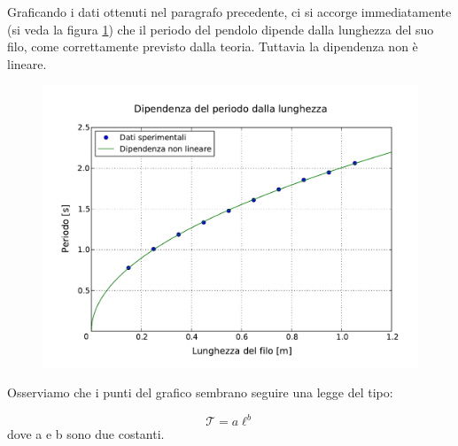 Graficando i dati ottenuti nel paragrafo precedente, ci si accorge immediatamente (si veda
la figura \ref{fig:lunghezza_periodo}) che il periodo del pendolo dipende dalla lunghezza
del suo filo, come correttamente previsto dalla teoria. Tuttavia la dipendenza non è lineare.

\begin{figure}
    \centering
    \includegraphics[width=120mm]{immagini/lunghezza_periodo.pdf}
    \caption{}
    \label{fig:lunghezza_periodo}
\end{figure}

Osserviamo che i punti del grafico sembrano seguire una legge del tipo:

\begin{equation}
    \mathcal{T} = a\ell^b
\end{equation}
%
dove a e b sono due costanti.
